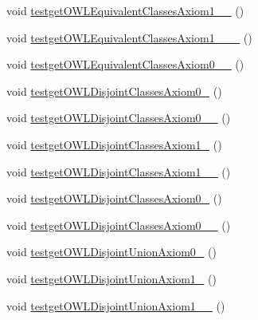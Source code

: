 \begin{DoxyCompactItemize}
void \hyperlink{classorg_1_1semanticweb_1_1owlapi_1_1api_1_1test_1_1_null_check_test_case_a1ab6c5fda562a82ec0097c59f44d4afa}{testget\-O\-W\-L\-Equivalent\-Classes\-Axiom1\-\_\-\_} ()
\item 
void \hyperlink{classorg_1_1semanticweb_1_1owlapi_1_1api_1_1test_1_1_null_check_test_case_ae0f9f26a8d41be4a823e476f6437dfd5}{testget\-O\-W\-L\-Equivalent\-Classes\-Axiom1\-\_\-\_\-\_} ()
\item 
void \hyperlink{classorg_1_1semanticweb_1_1owlapi_1_1api_1_1test_1_1_null_check_test_case_a9ce76f53777e782611c4855472280056}{testget\-O\-W\-L\-Equivalent\-Classes\-Axiom0\-\_\-\_} ()
\item 
void \hyperlink{classorg_1_1semanticweb_1_1owlapi_1_1api_1_1test_1_1_null_check_test_case_a4791cb7ed8477e59a00e282532eb43aa}{testget\-O\-W\-L\-Disjoint\-Classes\-Axiom0\-\_} ()
\item 
void \hyperlink{classorg_1_1semanticweb_1_1owlapi_1_1api_1_1test_1_1_null_check_test_case_a0f10bd49a4031c5c62e97d2db0ba6d78}{testget\-O\-W\-L\-Disjoint\-Classes\-Axiom0\-\_\-\_} ()
\item 
void \hyperlink{classorg_1_1semanticweb_1_1owlapi_1_1api_1_1test_1_1_null_check_test_case_a68bdd26969433a9212505dcf1d6f94c3}{testget\-O\-W\-L\-Disjoint\-Classes\-Axiom1\-\_} ()
\item 
void \hyperlink{classorg_1_1semanticweb_1_1owlapi_1_1api_1_1test_1_1_null_check_test_case_a1a0569099b93d2ff7fe183383a1d3c72}{testget\-O\-W\-L\-Disjoint\-Classes\-Axiom1\-\_\-\_} ()
\item 
void \hyperlink{classorg_1_1semanticweb_1_1owlapi_1_1api_1_1test_1_1_null_check_test_case_a67e4ce04ab703b1c9ad6d778c0783b0d}{testget\-O\-W\-L\-Disjoint\-Classes\-Axiom0\-\_} ()
\item 
void \hyperlink{classorg_1_1semanticweb_1_1owlapi_1_1api_1_1test_1_1_null_check_test_case_a4ee7ebb44ff1d16f47cb5bf3058bc799}{testget\-O\-W\-L\-Disjoint\-Classes\-Axiom0\-\_\-\_} ()
\item 
void \hyperlink{classorg_1_1semanticweb_1_1owlapi_1_1api_1_1test_1_1_null_check_test_case_a5cc4e0246f3a28deb64dda94cb165fb0}{testget\-O\-W\-L\-Disjoint\-Union\-Axiom0\-\_} ()
\item 
void \hyperlink{classorg_1_1semanticweb_1_1owlapi_1_1api_1_1test_1_1_null_check_test_case_acf63187530f2632645b98d7d54dfba87}{testget\-O\-W\-L\-Disjoint\-Union\-Axiom1\-\_} ()
\item 
void \hyperlink{classorg_1_1semanticweb_1_1owlapi_1_1api_1_1test_1_1_null_check_test_case_acb7dd2693479ae60b14c6e08c551cb13}{testget\-O\-W\-L\-Disjoint\-Union\-Axiom1\-\_\-\_} ()

\end{DoxyCompactItemize}
